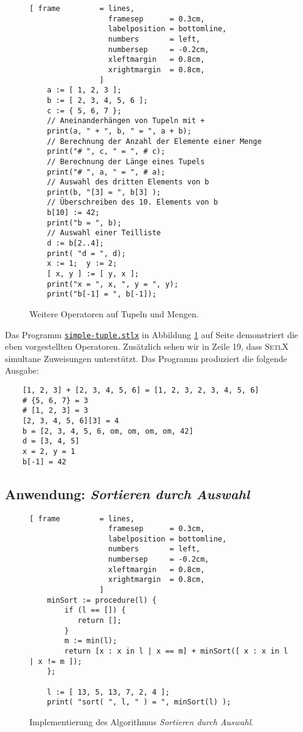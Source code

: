 \begin{figure}[!ht]
  \centering
\begin{Verbatim}[ frame         = lines, 
                  framesep      = 0.3cm, 
                  labelposition = bottomline,
                  numbers       = left,
                  numbersep     = -0.2cm,
                  xleftmargin   = 0.8cm,
                  xrightmargin  = 0.8cm,
                ]
    a := [ 1, 2, 3 ];
    b := [ 2, 3, 4, 5, 6 ];
    c := { 5, 6, 7 };
    // Aneinanderhängen von Tupeln mit +
    print(a, " + ", b, " = ", a + b);
    // Berechnung der Anzahl der Elemente einer Menge
    print("# ", c, " = ", # c);
    // Berechnung der Länge eines Tupels
    print("# ", a, " = ", # a);
    // Auswahl des dritten Elements von b
    print(b, "[3] = ", b[3] );
    // Überschreiben des 10. Elements von b
    b[10] := 42;
    print("b = ", b);
    // Auswahl einer Teilliste
    d := b[2..4];
    print( "d = ", d);
    x := 1;  y := 2;
    [ x, y ] := [ y, x ];
    print("x = ", x, ", y = ", y);
    print("b[-1] = ", b[-1]);
\end{Verbatim} 
\vspace*{-0.3cm}
\caption{Weitere Operatoren auf Tupeln und Mengen.}  \label{fig:simple-tuple.stlx}
\end{figure} %

Das Programm 
\href{https://github.com/karlstroetmann/Logik/blob/master/SetlX/simple-tuple.stlx}{\texttt{simple-tuple.stlx}}
in Abbildung \ref{fig:simple-tuple.stlx} auf Seite
\pageref{fig:simple-tuple.stlx} demonstriert die eben vorgestellten Operatoren.  
Zusätzlich sehen wir in Zeile 19, dass \textsc{SetlX} simultane Zuweisungen unterstützt.
Das Programm produziert die folgende Ausgabe:
\begin{verbatim}
    [1, 2, 3] + [2, 3, 4, 5, 6] = [1, 2, 3, 2, 3, 4, 5, 6]
    # {5, 6, 7} = 3
    # [1, 2, 3] = 3
    [2, 3, 4, 5, 6][3] = 4
    b = [2, 3, 4, 5, 6, om, om, om, om, 42]
    d = [3, 4, 5]
    x = 2, y = 1
    b[-1] = 42
\end{verbatim}


\subsection{Anwendung: \emph{Sortieren durch Auswahl}}
\begin{figure}[!ht]
\centering
\begin{Verbatim}[ frame         = lines, 
                  framesep      = 0.3cm, 
                  labelposition = bottomline,
                  numbers       = left,
                  numbersep     = -0.2cm,
                  xleftmargin   = 0.8cm,
                  xrightmargin  = 0.8cm,
                ]
    minSort := procedure(l) {
        if (l == []) {
           return [];
        }
        m := min(l);
        return [x : x in l | x == m] + minSort([ x : x in l | x != m ]);
    };

    l := [ 13, 5, 13, 7, 2, 4 ];
    print( "sort( ", l, " ) = ", minSort(l) );
\end{Verbatim}
\vspace*{-0.3cm}
\caption{Implementierung des Algorithmus \emph{Sortieren durch Auswahl}.}
\label{fig:min-sort.stlx}
\end{figure}

